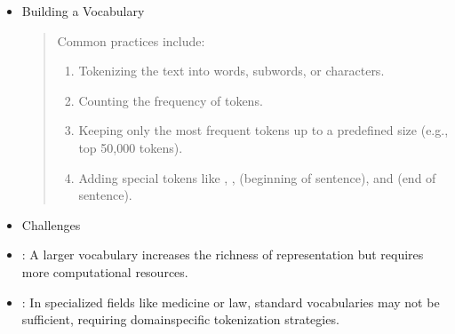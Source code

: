 \documentclass[letterpaper,11pt,english]{sphinxmanual}
\begin{document}
\begin{itemize}
\begin{quote}
. :
\sphinxhyphen{} Words not present in the vocabulary are either replaced with a special token like  or processed using subword/character\sphinxhyphen{}based techniques.
\end{quote}

\item {} 
\sphinxAtStartPar
Building a Vocabulary
\begin{quote}

\sphinxAtStartPar
Common practices include:
\begin{enumerate}
%
\item {} 
\sphinxAtStartPar
Tokenizing the text into words, subwords, or characters.

\item {} 
\sphinxAtStartPar
Counting the frequency of tokens.

\item {} 
\sphinxAtStartPar
Keeping only the most frequent tokens up to a predefined size (e.g., top 50,000 tokens).

\item {} 
\sphinxAtStartPar
Adding special tokens like , ,  (beginning of sentence), and  (end of sentence).

\end{enumerate}
\end{quote}

\item {} 
\sphinxAtStartPar
Challenges

\item {} 
\sphinxAtStartPar
{}:
A larger vocabulary increases the richness of representation but requires more computational resources.

\item {} 
\sphinxAtStartPar
{}:
In specialized fields like medicine or law, standard vocabularies may not be sufficient, requiring domain\sphinxhyphen{}specific tokenization strategies.

\end{itemize}
\end{document}
